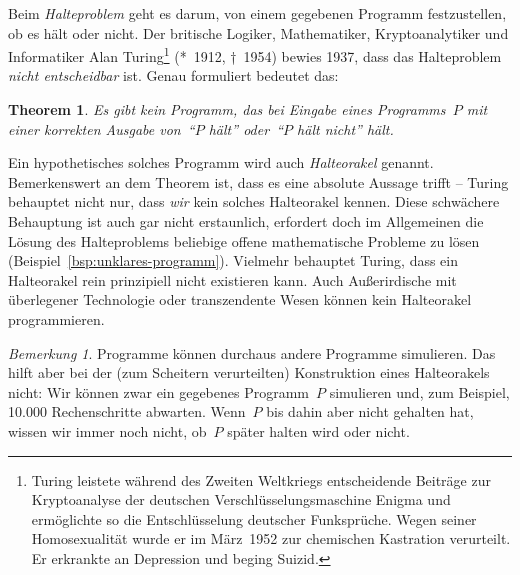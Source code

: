 \documentclass[twoside]{../zirkelblatt1415}
\theoremstyle{definition}
\theoremstyle{plain}
\newtheorem{thm}[defn]{Theorem}
\theoremstyle{remark}
\newtheorem{bem}[defn]{Bemerkung}
\begin{document}
Beim \emph{Halteproblem} geht es darum, von einem gegebenen Programm
festzustellen, ob es hält oder nicht. Der britische Logiker, Mathematiker,
Kryptoanalytiker und Informatiker Alan Turing\footnote{Turing leistete während des
Zweiten Weltkriegs entscheidende Beiträge zur Kryptoanalyse der
deutschen Verschlüsselungsmaschine Enigma und ermöglichte so die
Entschlüsselung deutscher Funksprüche. Wegen seiner Homosexualität wurde er
im März~1952 zur chemischen Kastration verurteilt. Er erkrankte an
Depression und beging Suizid.} (*~1912, †~1954) bewies 1937, dass das Halteproblem
\emph{nicht entscheidbar} ist. Genau formuliert bedeutet das:

\begin{thm}Es gibt kein Programm, das bei Eingabe eines Programms~$P$ mit einer
korrekten Ausgabe von~"`$P$ hält"' oder~"`$P$ hält nicht"' hält.\end{thm}

Ein hypothetisches solches Programm wird auch \emph{Halteorakel} genannt.
Bemerkenswert an dem Theorem ist, dass es eine absolute Aussage trifft --
Turing behauptet nicht nur, dass \emph{wir} kein solches Halteorakel kennen.
Diese schwächere Behauptung ist auch gar nicht erstaunlich, erfordert doch im
Allgemeinen die Lösung des Halteproblems beliebige offene mathematische
Probleme zu lösen (Beispiel~\ref{bsp:unklares-programm}).
Vielmehr behauptet Turing, dass ein Halteorakel rein prinzipiell nicht
existieren kann. Auch Außerirdische mit überlegener Technologie oder
transzendente Wesen können kein Halteorakel programmieren.

\begin{bem}Programme können durchaus andere Programme simulieren. Das hilft
aber bei der (zum Scheitern verurteilten) Konstruktion eines Halteorakels
nicht: Wir können zwar ein gegebenes Programm~$P$ simulieren und, zum Beispiel,
10.000 Rechenschritte abwarten. Wenn~$P$ bis dahin aber nicht gehalten hat,
wissen wir immer noch nicht, ob~$P$ später halten wird oder nicht.
\end{bem}
\end{document}
